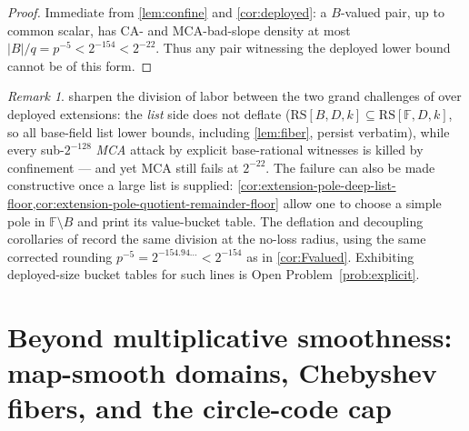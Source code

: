 \documentclass[11pt]{article}
\theoremstyle{definition}
\theoremstyle{remark}
\newtheorem{remark}[theorem]{Remark}
\newcommand{\F}{\mathbb{F}}
\newcommand{\B}{B}
\newcommand{\RS}{\mathrm{RS}}
\begin{document}
\begin{proof}
Immediate from \cref{lem:confine} and \cref{cor:deployed}: a $\B$-valued pair, up to common scalar, has CA- and MCA-bad-slope density at most $|\B|/q=p^{-5}<2^{-154}<2^{-22}$. Thus any pair witnessing the deployed lower bound cannot be of this form.
\end{proof}

\begin{remark}
 sharpen the division of labor between the two grand challenges of \cite{ABF26} over deployed extensions: the \emph{list} side does not deflate ($\RS[\B,D,k]\subseteq\RS[\F,D,k]$, so all base-field list lower bounds, including \cref{lem:fiber}, persist verbatim), while every sub-$2^{-128}$ \emph{MCA} attack by explicit base-rational witnesses is killed by confinement --- and yet MCA still fails at $2^{-22}$.  The failure can also be made constructive once a large list is supplied: \cref{cor:extension-pole-deep-list-floor,cor:extension-pole-quotient-remainder-floor} allow one to choose a simple pole in $\F\setminus\B$ and print its value-bucket table. The deflation and decoupling corollaries of \cite{Cho26b} record the same division at the no-loss radius, using the same corrected rounding $p^{-5}=2^{-154.94\ldots}<2^{-154}$ as in \cref{cor:Fvalued}. Exhibiting deployed-size bucket tables for such lines is Open Problem~\ref{prob:explicit}.
\end{remark}


\section{Beyond multiplicative smoothness: map-smooth domains, Chebyshev fibers, and the circle-code cap}\label{sec:isogeny}
\end{document}
